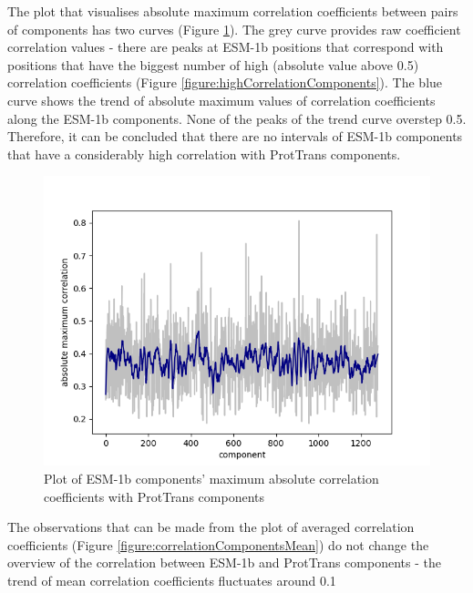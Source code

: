 \documentclass[12pt]{article}
\begin{document}
	\newpage

	The plot that visualises absolute maximum correlation coefficients between 
	pairs of components has two curves (Figure \ref{figure:correlationComponentsMax}). 
	The grey curve provides raw coefficient correlation values - there are peaks 
	at ESM-1b positions that correspond with positions that have the 
	biggest number of high (absolute value above 0.5) correlation coefficients
	(Figure \ref{figure:highCorrelationComponents}). The blue curve shows the trend 
	of absolute maximum values of correlation coefficients along the ESM-1b components.
	None of the peaks of the trend curve overstep 0.5. Therefore, it can 
	be concluded that there are no intervals of ESM-1b components that have 
	a considerably high correlation with ProtTrans components.

	\begin{figure}[h!]
		\centering
		\includegraphics[scale=0.85]{validation_small_set_2_joined_correlation_max.png}

		\caption{Plot of ESM-1b components' maximum absolute correlation coefficients 
		with ProtTrans components}
		\label{figure:correlationComponentsMax}
	\end{figure}

	\newpage

	The observations that can be made from the plot of averaged correlation 
	coefficients (Figure \ref{figure:correlationComponentsMean}) do not change the 
	overview of the correlation between 
	ESM-1b and ProtTrans components - the trend of mean correlation coefficients 
	fluctuates around 0.1
\end{document}
